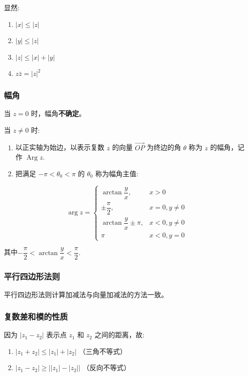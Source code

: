 显然:

\begin{enumerate}
\item \(|x|\le |z|\)
\item \(|y|\le |z|\)
\item \(|z| \le |x|+|y|\)
\item \(z\bar{z}=|z|^2\)
\end{enumerate}
\subsubsection{幅角}
\label{幅角}
当 \(z=0\) 时，幅角\textbf{不确定}。

当 \(z \ne 0\) 时:

\begin{enumerate}
\item 以正实轴为始边，以表示复数 \(z\) 的向量 \(\overrightarrow{OP}\)
为终边的角 \(\theta\) 称为 \(z\) 的幅角，记作
\(\operatorname{Arg}z.\)
\item 把满足 \(-\pi<\theta_0<\pi\) 的 \(\theta_0\) 称为幅角主值:
\end{enumerate}

\begin{equation*}
\operatorname{arg}z=
\begin{cases}
\arctan \dfrac{y}{x}, & x > 0 \\
\pm \dfrac{\pi}{2}, & x = 0,y \ne 0 \\
\arctan \dfrac{y}{x}\pm \pi, & x<0,y\ne 0\\
\pi & x<0, y=0
\end{cases}
\end{equation*}

其中\(-\dfrac{\pi}{2}<\arctan\dfrac{y}{x}<\dfrac{\pi}{2}.\)
\subsubsection{平行四边形法则}
\label{平行四边形法则}
平行四边形法则计算加减法与向量加减法的方法一致。
\subsubsection{复数差和模的性质}
\label{复数差和模的性质}
因为 \(|z_{1}-z_{2}|\) 表示点 \(z_{1}\) 和 \(z_{2}\) 之间的距离，故:

\begin{enumerate}
\item \(|z_{1} + z_{2}| \le |z_{1}| + |z_{2}|\) （三角不等式）
\item \(|z_{1} - z_{2}| \ge \left| |z_{1}| - |z_{2}| \right|\)
（反向不等式）
\end{enumerate}

